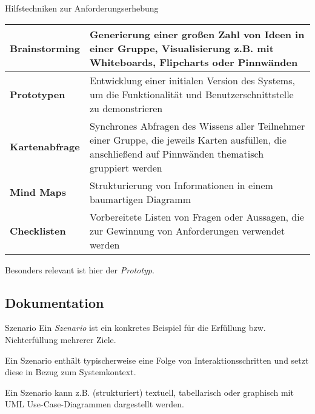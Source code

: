 \begin{defi}{Hilfstechniken zur Anforderungserhebung}
    \begin{tabularx}{\textwidth}{|>{\bfseries}l|X|}
        \hline
        Brainstorming & Generierung einer großen Zahl von Ideen in einer Gruppe, Visualisierung z.B. mit Whiteboards, Flipcharts oder Pinnwänden                                 \\
        \hline
        Prototypen    & Entwicklung einer initialen Version des Systems, um die Funktionalität und Benutzerschnittstelle zu demonstrieren                                        \\
        \hline
        Kartenabfrage & Synchrones Abfragen des Wissens aller Teilnehmer einer Gruppe, die jeweils Karten ausfüllen, die anschließend auf Pinnwänden thematisch gruppiert werden \\
        \hline
        Mind Maps     & Strukturierung von Informationen in einem baumartigen Diagramm                                                                                           \\
        \hline
        Checklisten   & Vorbereitete Listen von Fragen oder Aussagen, die zur Gewinnung von Anforderungen verwendet werden                                                       \\
        \hline
    \end{tabularx}

    Besonders relevant ist hier der \emph{Prototyp}.
\end{defi}

\subsection{Dokumentation}

\begin{defi}{Szenario}
    Ein \emph{Szenario} ist ein konkretes Beispiel für die Erfüllung bzw. Nichterfüllung mehrerer Ziele.

    Ein Szenario enthält typischerweise eine Folge von Interaktionsschritten und setzt diese in Bezug zum Systemkontext.

    Ein Szenario kann z.B. (strukturiert) textuell, tabellarisch oder graphisch mit UML Use-Case-Diagrammen dargestellt werden.
\end{defi}

